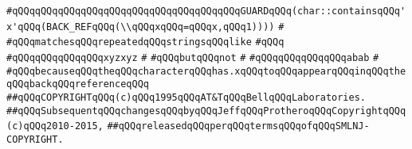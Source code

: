 \verb|#qQQqqQQqqQQqqQQqqQQqqQQqqQQqqQQqqQQqqQQqGUARDqQQq(char::containsqQQq'x'qQQq(BACK_REFqQQq(\\qQQqxqQQq=qQQqx,qQQq1))))|\newline
\verb|#|\newline
\verb|#qQQqmatchesqQQqrepeatedqQQqstringsqQQqlike|\newline
\verb|#qQQq|\newline
\verb|#qQQqqQQqqQQqqQQqxyzxyz|\newline
\verb|#|\newline
\verb|#qQQqbutqQQqnot|\newline
\verb|#|\newline
\verb|#qQQqqQQqqQQqqQQqabab|\newline
\verb|#|\newline
\verb|#qQQqbecauseqQQqtheqQQqcharacterqQQqhas.xqQQqtoqQQqappearqQQqinqQQqtheqQQqbackqQQqreferenceqQQq|\newline
\newline
\newline
\newline
\verb|##qQQqCOPYRIGHTqQQq(c)qQQq1995qQQqAT&TqQQqBellqQQqLaboratories.|\newline
\verb|##qQQqSubsequentqQQqchangesqQQqbyqQQqJeffqQQqProtheroqQQqCopyrightqQQq(c)qQQq2010-2015,|\newline
\verb|##qQQqreleasedqQQqperqQQqtermsqQQqofqQQqSMLNJ-COPYRIGHT.|\newline

